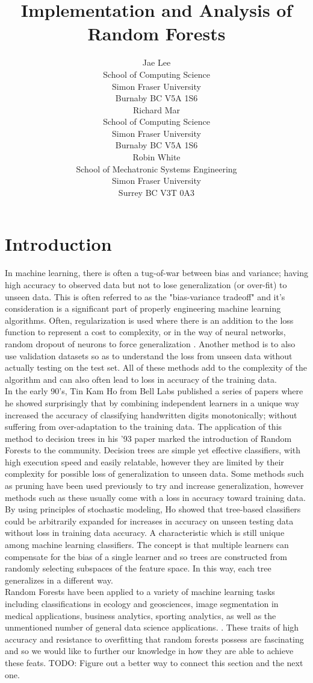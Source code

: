 \documentclass{article} %
\title{Implementation and Analysis of Random Forests}
\author{
Jae Lee\\
School of Computing Science\\
Simon Fraser University\\
Burnaby BC V5A 1S6 \\
\And
Richard Mar \\
School of Computing Science\\
Simon Fraser University\\
Burnaby BC V5A 1S6 \\
\AND
Robin White \\
School of Mechatronic Systems Engineering\\
Simon Fraser University\\
Surrey BC V3T 0A3 \\
}
\begin{document}
\maketitle

\section{Introduction}

In machine learning, there is often a tug-of-war between bias and variance; having high accuracy to observed data but not to lose generalization (or over-fit) to unseen data. This is often referred to as the "bias-variance tradeoff" and it's consideration is a significant part of properly engineering machine learning algorithms. Often, regularization is used where there is an addition to the loss function to represent a cost to complexity, or in the way of neural networks, random dropout of neurons to force generalization \cite{Srivastava2014}. Another method is to also use validation datasets so as to understand the loss from unseen data without actually testing on the test set. All of these methods add to the complexity of the algorithm and can also often lead to loss in accuracy of the training data.\\
In the early 90's, Tin Kam Ho from Bell Labs published a series of papers where he showed surprisingly that by combining independent learners in a unique way increased the accuracy of classifying handwritten digits monotonically; without suffering from over-adaptation to the training data. \cite{Ho93, Ho95, Ho98} The application of this method to decision trees in his '93 paper marked the introduction of Random Forests to the community. \cite{Ho93} Decision trees are simple yet effective classifiers, with high execution speed and easily relatable, however they are limited by their complexity for possible loss of generalization to unseen data. Some methods such as pruning have been used previously to try and increase generalization, however methods such as these usually come with a loss in accuracy toward training data. By using principles of stochastic modeling, Ho showed that tree-based classifiers could be arbitrarily expanded for increases in accuracy on unseen testing data without loss in training data accuracy. A characteristic which is still unique among machine learning classifiers. The concept is that multiple learners can compensate for the bias of a single learner and so trees are constructed from randomly selecting subspaces of the feature space. In this way, each tree generalizes in a different way. \\
Random Forests have been applied to a variety of machine learning tasks including classifications in ecology and geosciences, image segmentation in medical applications, business analytics, sporting analytics, as well as the unmentioned number of general data science applications. \cite{Cutler2007, Harris2015, Luo2017, Ghatasheh2014, Lock2014}.  These traits of high accuracy and resistance to overfitting that random forests possess are fascinating and so we would like to further our knowledge in how they are able to achieve these feats.  TODO: Figure out a better way to connect this section and the next one.
\end{document}

